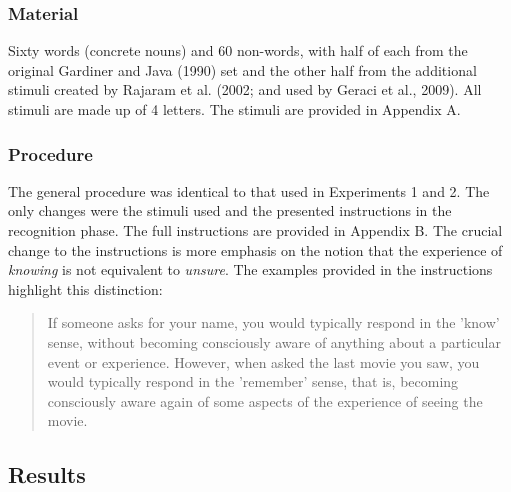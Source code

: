 \documentclass[english,,man,floatsintext]{apa6}
\begin{document}
\hypertarget{material-2}{%
\subsubsection{Material}\label{material-2}}

Sixty words (concrete nouns) and 60 non-words, with half of each from the original Gardiner and Java (1990) set and the other half from the additional stimuli created by Rajaram et al. (2002; and used by Geraci et al., 2009). All stimuli are made up of 4 letters. The stimuli are provided in Appendix A.

\hypertarget{procedure-2}{%
\subsubsection{Procedure}\label{procedure-2}}

The general procedure was identical to that used in Experiments 1 and 2. The only changes were the stimuli used and the presented instructions in the recognition phase. The full instructions are provided in Appendix B. The crucial change to the instructions is more emphasis on the notion that the experience of \emph{knowing} is not equivalent to \emph{unsure}. The examples provided in the instructions highlight this distinction:

\begin{quote}
If someone asks for your name, you would typically respond in the ’know’ sense, without becoming consciously aware of anything about a particular event or experience. However, when asked the last movie you saw, you would typically respond in the ’remember’ sense, that is, becoming consciously aware again of some aspects of the experience of seeing the movie.
\end{quote}

\hypertarget{results-3}{%
\subsection{Results}\label{results-3}}
\end{document}
